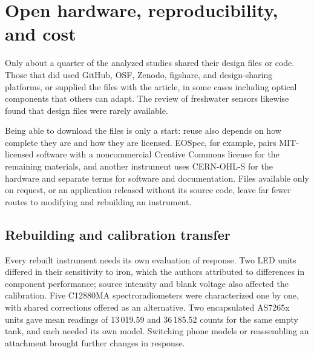 \section{Open hardware, reproducibility, and cost}\label{sec:openhw}

Only about a quarter of the analyzed studies shared their design files or code. Those that did used GitHub, OSF, Zenodo, figshare, and design-sharing platforms,\citep{wittbrodt2015open,feng2021open,bulusu2024technical,stevens2024low,bogucki2019d,grasse2015teaching} or supplied the files with the article,\citep{prairie2020accurate,nonno2022portuino,delmonache2025multipurpose,yu2023open} in some cases including optical components that others can adapt.\citep{zhang2013open} The review of freshwater sensors likewise found that design files were rarely available.\citep{cirrone2026analytical}

Being able to download the files is only a start: reuse also depends on how complete they are and how they are licensed.\citep{wenzel2023open} EOSpec, for example, pairs MIT-licensed software with a noncommercial Creative Commons license for the remaining materials,\citep{feng2021open} and another instrument uses CERN-OHL-S for the hardware and separate terms for software and documentation.\citep{moralesguerra2026low} Files available only on request,\citep{glotz2018design,markvart2020continuous} or an application released without its source code,\citep{hosker2017demonstrating} leave far fewer routes to modifying and rebuilding an instrument.

\subsection{Rebuilding and calibration transfer}

Every rebuilt instrument needs its own evaluation of response. Two LED units differed in their sensitivity to iron, which the authors attributed to differences in component performance; source intensity and blank voltage also affected the calibration.\citep{prairie2020accurate} Five C12880MA spectroradiometers were characterized one by one, with shared corrections offered as an alternative.\citep{troscianko2023osprad} Two encapsulated AS7265x units gave mean readings of 13\,019.59 and 36\,185.52 counts for the same empty tank, and each needed its own model.\citep{stevens2024low} Switching phone models or reassembling an attachment brought further changes in response.\citep{bruininks2022inexpensive,vidal2021use}

